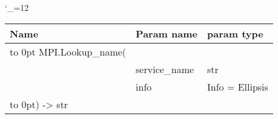 \begingroup \catcode`\_=12 \tt
\begin{tabular}{lll}
\toprule
\textrm{Name}&\textrm{Param name}&\textrm{param type}\\
\midrule
\hbox to 0pt {MPI.Lookup_name(\hss}\\
& service_name & str\\
& info & Info = Ellipsis\\
\hbox to 0pt{) -> str\hss}\\
\bottomrule
\end{tabular}
\endgroup
